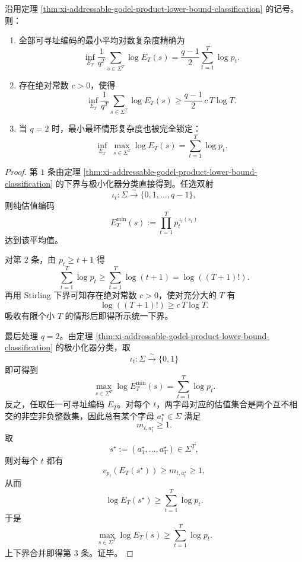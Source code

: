 \begin{corollary}\label{cor:xi-addressable-godel-average-binary-optimality}
沿用定理 \ref{thm:xi-addressable-godel-product-lower-bound-classification} 的记号。则：
\begin{enumerate}
  \item 全部可寻址编码的最小平均对数复杂度精确为
  \[
  \inf_{E_T}
  \frac{1}{q^T}\sum_{s\in\Sigma^T}\log E_T(s)
  =
  \frac{q-1}{2}\sum_{t=1}^{T}\log p_t.
  \]
  \item 存在绝对常数 \(c>0\)，使得
  \[
  \inf_{E_T}
  \frac{1}{q^T}\sum_{s\in\Sigma^T}\log E_T(s)
  \ge
  \frac{q-1}{2}\,c\,T\log T.
  \]
  \item 当 \(q=2\) 时，最小最坏情形复杂度也被完全锁定：
  \[
  \inf_{E_T}\ \max_{s\in\Sigma^T}\log E_T(s)
  =
  \sum_{t=1}^{T}\log p_t.
  \]
\end{enumerate}
\end{corollary}
\begin{proof}
第 \(1\) 条由定理 \ref{thm:xi-addressable-godel-product-lower-bound-classification} 的下界与极小化器分类直接得到。任选双射
\[
\iota_t:\Sigma\xrightarrow{\sim}\{0,1,\dots,q-1\},
\]
则纯估值编码
\[
E_T^{\min}(s):=\prod_{t=1}^{T}p_t^{\,\iota_t(s_t)}
\]
达到该平均值。

对第 \(2\) 条，由 \(p_t\ge t+1\) 得
\[
\sum_{t=1}^{T}\log p_t
\ge
\sum_{t=1}^{T}\log(t+1)
=
\log((T+1)!).
\]
再用 Stirling 下界可知存在绝对常数 \(c>0\)，使对充分大的 \(T\) 有
\[
\log((T+1)!)\ge c\,T\log T.
\]
吸收有限个小 \(T\) 的情形后即得所示统一下界。

最后处理 \(q=2\)。由定理 \ref{thm:xi-addressable-godel-product-lower-bound-classification} 的极小化器分类，取
\[
\iota_t:\Sigma\xrightarrow{\sim}\{0,1\}
\]
即可得到
\[
\max_{s\in\Sigma^T}\log E_T^{\min}(s)=\sum_{t=1}^{T}\log p_t.
\]
反之，任取任一可寻址编码 \(E_T\)。对每个 \(t\)，两字母对应的估值集合是两个互不相交的非空非负整数集，因此总有某个字母 \(a_t^\star\in\Sigma\) 满足
\[
m_{t,a_t^\star}\ge 1.
\]
取
\[
s^\star:=(a_1^\star,\dots,a_T^\star)\in\Sigma^T,
\]
则对每个 \(t\) 都有
\[
v_{p_t}(E_T(s^\star))\ge m_{t,a_t^\star}\ge 1,
\]
从而
\[
\log E_T(s^\star)\ge \sum_{t=1}^{T}\log p_t.
\]
于是
\[
\max_{s\in\Sigma^T}\log E_T(s)\ge \sum_{t=1}^{T}\log p_t.
\]
上下界合并即得第 \(3\) 条。证毕。
\end{proof}
